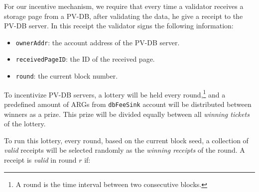 For our incentive mechanism, we require that every time a validator receives a storage page from a PV-DB, after
validating the data, he give a receipt to the PV-DB server. In this receipt the validator signs the
following information:

\begin{itemize}
    \item \texttt{ownerAddr}: the account address of the PV-DB server.
    \item \texttt{receivedPageID}: the ID of the received page.
    \item \texttt{round}: the current block number.
\end{itemize}


To incentivize PV-DB servers, a lottery will be held every round,\footnote{A round is the time interval between
two consecutive blocks.} and a predefined amount of ARGs from
\texttt{dbFeeSink} account will be distributed between winners as a prize. This prize will be divided equally
between all \emph{winning tickets} of the lottery.


To run this lottery, every round, based on the current block seed, a collection of \emph{valid} receipts will be
selected randomly as the \emph{winning receipts} of the round. A receipt is \emph{valid} in round $r$ if:

